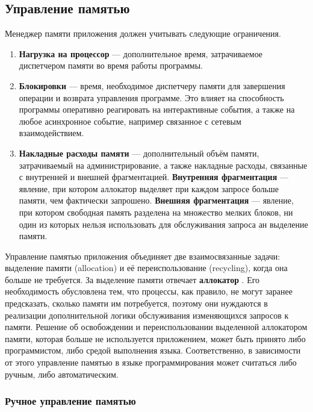 \subsection{Управление памятью}

Менеджер памяти приложения должен учитывать следующие ограничения. \cite{glossary}

\begin{enumerate}[label*=\arabic*.]
	\item \textbf{Нагрузка на процессор} --- дополнительное время, затрачиваемое диспетчером памяти во время работы программы.
	\item \textbf{Блокировки} --- время, необходимое диспетчеру памяти для завершения операции и возврата управления программе. Это влияет на способность программы оперативно реагировать на интерактивные события, а также на любое асинхронное событие, например связанное с сетевым взаимодействием.
	\item \textbf{Накладные расходы памяти} --- дополнительный объём памяти, затрачиваемый на администрирование, а также накладные расходы, связанные с внутренней и внешней фрагментацией. \textbf{Внутренняя фрагментация} --- явление, при котором аллокатор выделяет при каждом запросе больше памяти, чем фактически запрошено. \textbf{Внешняя фрагментация} --- явление, при котором свободная память разделена на множество мелких блоков, ни один из которых нельзя использовать для обслуживания запроса ан выделение памяти.
\end{enumerate}

Управление памятью приложения объединяет две взаимосвязанные задачи: выделение памяти (allocation) и её переиспользование (recycling), когда она больше не требуется. За выделение памяти отвечает \textbf{аллокатор} \cite{allocator}. Его необходимость обусловлена тем, что процессы, как правило, не могут заранее предсказать, сколько памяти им потребуется, поэтому они нуждаются в реализации дополнительной логики обслуживания изменяющихся запросов к памяти. Решение об освобождении и переиспользовании выделенной аллокатором памяти, которая больше не используется приложением, может быть принято либо программистом, либо средой выполнения языка. Соответственно, в зависимости от этого управление памятью в языке программирования может считаться либо ручным, либо автоматическим.

\subsubsection{Ручное управление памятью}

